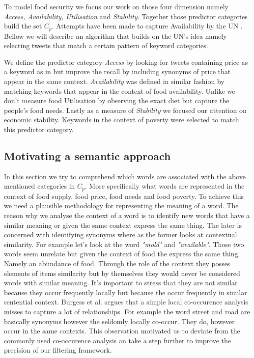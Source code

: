 \documentclass[12pt]{report}
\begin{document}
To model food security we focus our work on those four dimension namely \emph{Access, Availability, Utilisation} and \emph{Stability}. Together those predictor categories build the set $C_p$. Attempts have been made to capture Availability by the UN \cite{ungp2013}. Bellow we will describe an algorithm that builds on the UN's idea namely selecting tweets that match a certain pattern of keyword categories. 


We define the predictor category \emph{Access} by looking for tweets containing price as a keyword as in \cite{ungp2013} but improve the recall by including synonyms of price that appear in the same context. \emph{Availability} was defined in similar fashion by matching keywords that appear in the context of food availability. Unlike \cite{AbbarMW14} we don't measure food Utilisation by observing the exact diet but capture the people's food needs. Lastly as a measure of \emph{Stability} we focused our attention on economic stability. Keywords in the context of  poverty were selected to match this predictor category. 

\subsection{Motivating a semantic approach}
\label{subsec:hal}

In this section we try to comprehend which words are associated with the above mentioned categories in $C_p$. More specifically what words are represented in the context of food supply, food price, food needs and food poverty. To achieve this we need a plausible methodology for representing the meaning of a word. The reason why we analyse the context of a word is to identify new words that have a similar meaning or given the same context express the same thing. The later is concerned with identifying synonyms where as the former looks at contextual similarity. For example let's look at the word \emph {"mold"} and  \emph {"available"}. Those two words seem unrelate but given the context of food the express the same thing.  Namely an abundance of food. Through the role  of the context they posses elements of items similarity but by themselves they would never be considered words with similar meaning. It's important to stress that they are not similar because they occur frequently locally but because the occur frequently in similar sentential context. Burgess et al. \cite{burgess98} argues that a simple local co-occurence analysis misses to capture a lot of relationships. For example the word street and road are basically synonyms however the seldomly locally co-occur. They do, however occur in the same contexts. This observation motivated us to deviate from the commonly used co-occurence analysis an take a step further to improve the precision of our filtering framework. 
\end{document}
